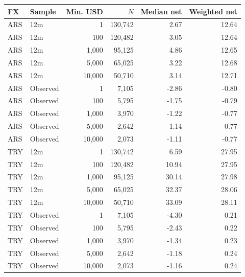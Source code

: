 \begin{tabular}{llrrrr}
\toprule
FX & Sample & Min. USD & $N$ & Median net & Weighted net \\
\midrule
ARS & 12m & 1 & 130,742 & 2.67 & 12.64 \\
ARS & 12m & 100 & 120,482 & 3.05 & 12.64 \\
ARS & 12m & 1,000 & 95,125 & 4.86 & 12.65 \\
ARS & 12m & 5,000 & 65,025 & 3.22 & 12.68 \\
ARS & 12m & 10,000 & 50,710 & 3.14 & 12.71 \\
ARS & Observed & 1 & 7,105 & -2.86 & -0.80 \\
ARS & Observed & 100 & 5,795 & -1.75 & -0.79 \\
ARS & Observed & 1,000 & 3,970 & -1.22 & -0.77 \\
ARS & Observed & 5,000 & 2,642 & -1.14 & -0.77 \\
ARS & Observed & 10,000 & 2,073 & -1.11 & -0.77 \\
TRY & 12m & 1 & 130,742 & 6.59 & 27.95 \\
TRY & 12m & 100 & 120,482 & 10.94 & 27.95 \\
TRY & 12m & 1,000 & 95,125 & 30.14 & 27.98 \\
TRY & 12m & 5,000 & 65,025 & 32.37 & 28.06 \\
TRY & 12m & 10,000 & 50,710 & 33.09 & 28.11 \\
TRY & Observed & 1 & 7,105 & -4.30 & 0.21 \\
TRY & Observed & 100 & 5,795 & -2.43 & 0.22 \\
TRY & Observed & 1,000 & 3,970 & -1.34 & 0.23 \\
TRY & Observed & 5,000 & 2,642 & -1.18 & 0.24 \\
TRY & Observed & 10,000 & 2,073 & -1.16 & 0.24 \\
\bottomrule
\end{tabular}
